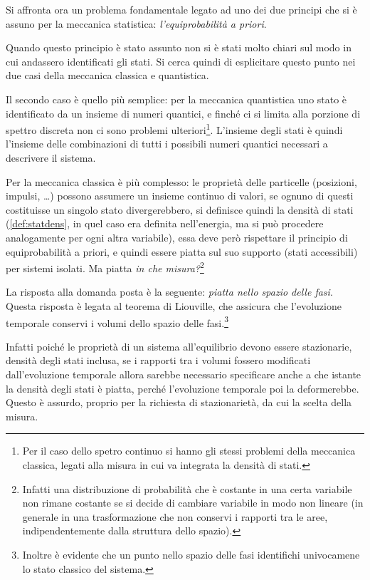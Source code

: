 Si affronta ora un problema fondamentale legato ad uno dei due principi che si è assuno per la meccanica statistica: \textit{l'equiprobabilità a priori}.
\newline

Quando questo principio è stato assunto non si è stati molto chiari sul modo in cui andassero identificati gli stati. Si cerca quindi di esplicitare questo punto nei due casi della meccanica classica e quantistica.

Il secondo caso è quello più semplice: per la meccanica quantistica uno stato è identificato da un insieme di numeri quantici, e finché ci si limita alla porzione di spettro discreta non ci sono problemi ulteriori\footnote{Per il caso dello spetro continuo si hanno gli stessi problemi della meccanica classica, legati alla misura in cui va integrata la densità di stati.}. L'insieme degli stati è quindi l'insieme delle combinazioni di tutti i possibili numeri quantici necessari a descrivere il sistema.

Per la meccanica classica è più complesso: le proprietà delle particelle (posizioni, impulsi, \dots) possono assumere un insieme continuo di valori, se ognuno di questi costituisse un singolo stato divergerebbero, si definisce quindi la densità di stati (\cref{def:statdens}, in quel caso era definita nell'energia, ma si può procedere analogamente per ogni altra variabile), essa deve però rispettare il principio di equiprobabilità a priori, e quindi essere piatta sul suo supporto (stati accessibili) per sistemi isolati. Ma piatta \textit{in che misura?}\footnote{Infatti una distribuzione di probabilità che è costante in una certa variabile non rimane costante se si decide di cambiare variabile in modo non lineare (in generale in una trasformazione che non conservi i rapporti tra le aree, indipendentemente dalla struttura dello spazio).}
\newline

La risposta alla domanda posta è la seguente: \textit{piatta nello spazio delle fasi}. Questa risposta è legata al teorema di Liouville, che assicura che l'evoluzione temporale conservi i volumi dello spazio delle fasi.\footnote{Inoltre è evidente che un punto nello spazio delle fasi identifichi univocamene lo stato classico del sistema.} 

Infatti poiché le proprietà di un sistema all'equilibrio devono essere stazionarie, densità degli stati inclusa, se i rapporti tra i volumi fossero modificati dall'evoluzione temporale allora sarebbe necessario specificare anche a che istante la densità degli stati è piatta, perché l'evoluzione temporale poi la deformerebbe. Questo è assurdo, proprio per la richiesta di stazionarietà, da cui la scelta della misura.
\newline

